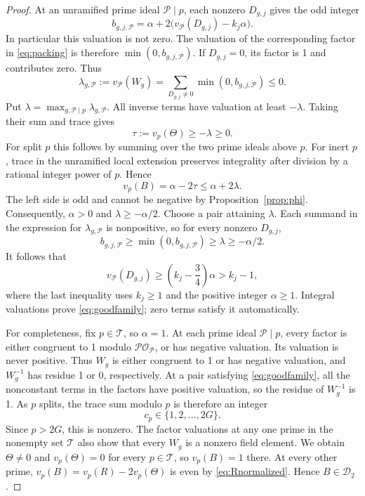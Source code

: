 \documentclass[11pt,reqno]{amsart}
\theoremstyle{definition}
\numberwithin{equation}{section}
\newcommand{\OO}{\mathcal O}
\def\l{\left}
\def\r{\right}
\def\f{\frac}
\begin{document}
\begin{proof}
At an unramified prime ideal ${\mathcal P}\mid p$, each nonzero $D_{g,j}$ gives the odd integer
\[
 b_{g,j,{\mathcal P}}=\alpha+2\bigl(v_{\mathcal P}(D_{g,j})-k_j\alpha\bigr).
\]
In particular this valuation is not zero. The valuation of the corresponding factor in \eqref{eq:packing} is therefore $\min(0,b_{g,j,{\mathcal P}})$. If $D_{g,j}=0$, its factor is 1 and contributes zero. Thus
\[
 \lambda_{g,{\mathcal P}}:=v_{\mathcal P}(W_g)
 =\sum_{D_{g,j}\ne0}\min(0,b_{g,j,{\mathcal P}})\le0.
\]
Put $\lambda=\max_{g,{\mathcal P}\mid p}\lambda_{g,{\mathcal P}}$. All inverse terms have valuation at least $-\lambda$. Taking their sum and trace gives
\[
 \tau:=v_p(\Theta)\ge-\lambda\ge0.
\]
For split $p$ this follows by summing over the two prime ideals above $p$. For inert $p$, trace in the unramified local extension preserves integrality after division by a rational integer power of $p$. Hence
\[
 v_p(B)=\alpha-2\tau\le\alpha+2\lambda.
\]
The left side is odd and cannot be negative by Proposition~\ref{prop:phi}. Consequently, $\alpha>0$ and $\lambda\ge-\alpha/2$. Choose a pair attaining $\lambda$. Each summand in the expression for $\lambda_{g,{\mathcal P}}$ is nonpositive, so for every nonzero $D_{g,j}$,
\[
 b_{g,j,{\mathcal P}}\ge\min(0,b_{g,j,{\mathcal P}})\ge\lambda\ge-\alpha/2.
\]
It follows that
\[
 v_{\mathcal P}(D_{g,j})\ge\l(k_j-\f34\r)\alpha>k_j-1,
\]
where the last inequality uses $k_j\ge1$ and the positive integer $\alpha\ge1$. Integral valuations prove \eqref{eq:goodfamily}; zero terms satisfy it automatically.

For completeness, fix $p\in\mathcal T$, so $\alpha=1$. At each prime ideal $\mathcal P\mid p$, every factor is either congruent to 1 modulo $\mathcal P\OO_{\mathcal P}$, or has negative valuation. Its valuation is never positive. Thus $W_g$ is either congruent to 1 or has negative valuation, and $W_g^{-1}$ has residue 1 or 0, respectively. At a pair satisfying \eqref{eq:goodfamily}, all the nonconstant terms in the factors have positive valuation, so the residue of $W_g^{-1}$ is 1. As $p$ splits, the trace sum modulo $p$ is therefore an integer
\[
 c_p\in\{1,2,\ldots,2G\}.
\]
Since $p>2G$, this is nonzero. The factor valuations at any one prime in the nonempty set $\mathcal T$ also show that every $W_g$ is a nonzero field element. We obtain $\Theta\ne0$ and $v_p(\Theta)=0$ for every $p\in\mathcal T$, so $v_p(B)=1$ there. At every other prime, $v_p(B)=v_p(R)-2v_p(\Theta)$ is even by \eqref{eq:Rnormalized}. Hence $B\in\mathcal D_2$.
\end{proof}
\end{document}
